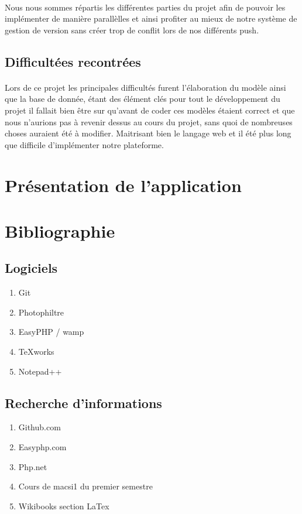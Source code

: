 \documentclass[a4paper, 12pt]{article}
\begin{document}
\paragraph{}Nous nous sommes répartis les différentes parties du projet afin de pouvoir les implémenter de manière parallèlles et ainsi profiter au mieux de notre système de gestion de version sans créer trop de conflit lors de nos différents push.

\newpage
\subsection{Difficultées recontrées}
\paragraph{}Lors de ce projet les principales difficultés furent l'élaboration du modèle ainsi que la base de donnée, étant des élément clés pour tout le développement du projet il fallait bien être sur qu'avant de coder ces modèles étaient correct et que nous n'aurions pas à revenir dessus au cours du projet, sans quoi de nombreuses choses auraient été à modifier. Maitrisant bien le langage web et il été plus long que difficile d'implémenter notre plateforme.




\newpage

\section{Présentation de l'application}


\newpage

\section{Bibliographie}
\subsection{Logiciels}
\begin{enumerate}
	\item Git
	\item Photophiltre
	\item EasyPHP / wamp
	\item TeXworks
	\item Notepad++
\end{enumerate}

\subsection{Recherche d’informations}
\begin{enumerate}
	\item Github.com
	\item Easyphp.com
	\item Php.net
	\item Cours de macsi1 du premier semestre
	\item Wikibooks section LaTex
\end{enumerate}
\end{document}
